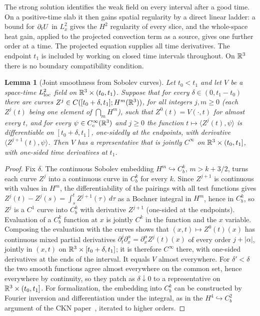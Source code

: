 \documentclass[11pt,letterpaper]{article}
\numberwithin{equation}{section}
\theoremstyle{plain}
\newtheorem{lemma}[theorem]{Lemma}
\theoremstyle{definition}
\theoremstyle{remark}
\begin{document}
The strong solution identifies the weak field on every interval after a
good time. On a positive-time slab it then gains spatial regularity by a
direct linear ladder: a bound for $\partial_t U$ in $L^2_x$ gives the $H^2$
regularity of every slice, and the whole-space heat gain, applied to the
projected convection term as a source, gives one further order at a time.
The projected equation supplies all time derivatives. The endpoint $t_1$ is
included by working on closed time intervals throughout. On $\mathbb{R}^3$ there is no
boundary compatibility condition.

\begin{lemma}[Joint smoothness from Sobolev curves]\label{lem:lps-Bochner-joint-smooth}
Let $t_0<t_1$ and let $V$ be a space-time $L^2_{\rm loc}$ field on
$\mathbb{R}^3\times(t_0,t_1)$. Suppose that for every $\delta\in(0,t_1-t_0)$ there
are curves $Z^j\in C([t_0+\delta,t_1];H^m(\mathbb{R}^3))$, for all integers $j,m\ge0$
(each $Z^j(t)$ being one element of $\bigcap_mH^m$), such that
$Z^0(t)=V(\cdot,t)$ for almost every $t$, and for every
$\psi\in C_c^\infty(\mathbb{R}^3)$ and $j\ge0$ the function
$t\mapsto\langle Z^j(t),\psi\rangle$ is differentiable on $[t_0+\delta,t_1]$,
one-sidedly at the endpoints, with derivative
$\langle Z^{j+1}(t),\psi\rangle$. Then $V$ has a representative that is
jointly $C^\infty$ on $\mathbb{R}^3\times(t_0,t_1]$, with one-sided time derivatives
at $t_1$.
\end{lemma}

\begin{proof}
Fix $\delta$. The continuous Sobolev embedding $H^m\hookrightarrow C_b^k$,
$m>k+3/2$, turns each curve $Z^j$ into a continuous curve in $C_b^k$ for every
$k$. Since $Z^{j+1}$ is continuous with values in $H^m$, the
differentiability of the pairings with all test functions gives
$Z^j(t)-Z^j(s)=\int_s^tZ^{j+1}(\tau)\,d\tau$ as a Bochner integral in $H^m$,
hence in $C_b^k$, so $Z^j$ is a $C^1$ curve into $C_b^k$ with derivative
$Z^{j+1}$ (one-sided at the endpoints). Evaluation of a $C_b^k$ function at
$x$ is jointly $C^k$ in the function and the $x$ variable. Composing the
evaluation with the curves shows that
$(x,t)\mapsto Z^0(t)(x)$ has continuous mixed partial derivatives
$\partial_t^j\partial_x^\alpha=\partial_x^\alpha Z^j(t)(x)$ of every
order $j+|\alpha|$, jointly in $(x,t)$ on $\mathbb{R}^3\times[t_0+\delta,t_1]$; it is
therefore $C^\infty$ there, with one-sided derivatives at the ends of the
interval. It equals $V$ almost everywhere. For $\delta'<\delta$ the two
smooth functions agree almost everywhere on the common set, hence everywhere
by continuity, so they patch as $\delta\downarrow0$ to a representative on
$\mathbb{R}^3\times(t_0,t_1]$.
For formalization, the embedding into $C_b^k$ can be constructed by
Fourier inversion and differentiation under the integral, as in the
$H^4\hookrightarrow C_b^2$ argument of the CKN paper~\cite{CKNLean}, iterated to higher
orders.
\end{proof}
\end{document}

